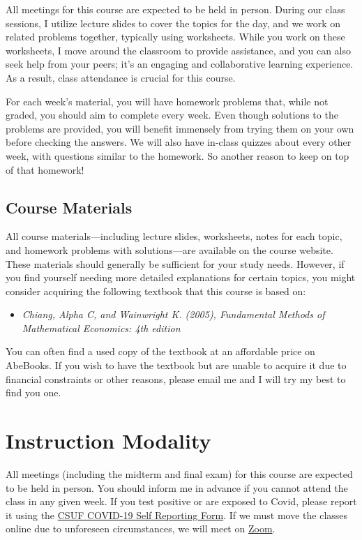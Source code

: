 \documentclass{./../Latex/syllabus}
\begin{document}
All meetings for this course are expected to be held in person. During our class sessions, I utilize lecture slides to cover the topics for the day, and we work on related problems together, typically using worksheets. While you work on these worksheets, I move around the classroom to provide assistance, and you can also seek help from your peers; it's an engaging and collaborative learning experience. As a result, class attendance is crucial for this course.

For each week's material, you will have homework problems that, while not graded, you should aim to complete every week. Even though solutions to the problems are provided, you will benefit immensely from trying them on your own before checking the answers. We will also have in-class quizzes about every other week, with questions similar to the homework. So another reason to keep on top of that homework!

\subsection*{Course Materials}

All course materials—including lecture slides, worksheets, notes for each topic, and homework problems with solutions—are available on the course website. These materials should generally be sufficient for your study needs. However, if you find yourself needing more detailed explanations for certain topics, you might consider acquiring the following textbook that this course is based on:

\begin{itemize}
  \item \textit{Chiang, Alpha C, and Wainwright K. (2005), Fundamental Methods of Mathematical Economics: 4th edition}
\end{itemize}

You can often find a used copy of the textbook at an affordable price on AbeBooks. If you wish to have the textbook but are unable to acquire it due to financial constraints or other reasons, please email me and I will try my best to find you one.

\section*{Instruction Modality}
All meetings (including the midterm and final exam) for this course are expected to be held in person. You should inform me in advance if you cannot attend the class in any given week. If you test positive or are exposed to Covid, please report it using the \href{https://coronavirus.fullerton.edu/report-covid-19-case-or-exposure/}{CSUF COVID-19 Self Reporting Form}. If we must move the classes online due to unforeseen circumstances, we will meet on \href{https://fullerton.zoom.us/j/81895171931}{Zoom}.
\end{document}
